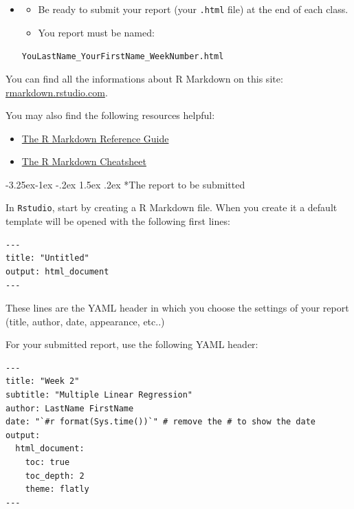 \documentclass[]{book}
\makeatletter
\providecommand{\tightlist}{%
  \setlength{\itemsep}{0pt}\setlength{\parskip}{0pt}}
\newenvironment{rmdblock}[1]
  {\begin{shaded*}
  \begin{itemize}
  \renewcommand{\labelitemi}{
    \raisebox{-.7\height}[0pt][0pt]{
      {\setkeys{Gin}{width=2em,keepaspectratio}\texttt{[image: img/icons/\#1]}}
    }
  }
  \item
  }
  {
  \end{itemize}
  \end{shaded*}
  }
\newenvironment{rmdcaution}
  {\begin{rmdblock}{caution}}
  {\end{rmdblock}}
\renewcommand\subsection{\@startsection{subsection}{2}{\z@}%
                                     {-3.25ex\@plus -1ex \@minus -.2ex}%
                                     {1.5ex \@plus .2ex}%
                                     {\normalfont\large\bfseries\color{Violet}}}
\theoremstyle{definition}
\theoremstyle{definition}
\theoremstyle{definition}
\theoremstyle{remark}
\makeatother
\begin{document}
\begin{rmdcaution}
\begin{itemize}
\item
  Be ready to submit your report (your \texttt{.html} file) at the end
  of each class.
\item
  You report must be named:
\end{itemize}

\texttt{YouLastName\_YourFirstName\_WeekNumber.html}
\end{rmdcaution}

You can find all the informations about R Markdown on this site:
\href{http://rmarkdown.rstudio.com/lesson-1.html}{rmarkdown.rstudio.com}.

You may also find the following resources helpful:

\begin{itemize}
\tightlist
\item
  \href{https://www.rstudio.com/wp-content/uploads/2015/03/rmarkdown-reference.pdf}{The
  R Markdown Reference Guide}
\item
  \href{https://www.rstudio.com/wp-content/uploads/2016/03/rmarkdown-cheatsheet-2.0.pdf}{The
  R Markdown Cheatsheet}
\end{itemize}

\subsection*{The report to be
submitted}\label{the-report-to-be-submitted}

In \texttt{Rstudio}, start by creating a R Markdown file. When you
create it a default template will be opened with the following first
lines:

\begin{verbatim}
---
title: "Untitled"
output: html_document
---
\end{verbatim}

These lines are the YAML header in which you choose the settings of your
report (title, author, date, appearance, etc..)

For your submitted report, use the following YAML header:

\begin{verbatim}
---
title: "Week 2"
subtitle: "Multiple Linear Regression"
author: LastName FirstName
date: "`#r format(Sys.time())`" # remove the # to show the date
output:
  html_document:
    toc: true
    toc_depth: 2
    theme: flatly
---
\end{verbatim}
\end{document}

